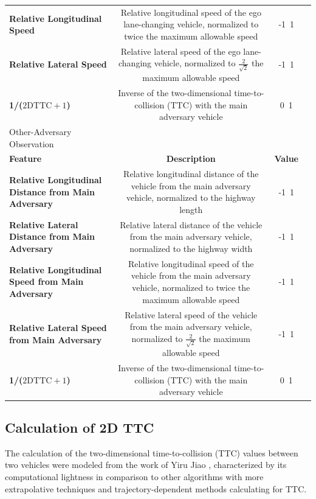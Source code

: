 \documentclass[12pt, a4paper]{report}
\begin{document}
\begin{table}[htbp]
\begin{tabular}{lccc}
        \textbf{Relative Longitudinal Speed} &  Relative longitudinal speed of the ego lane-changing vehicle, normalized to twice the maximum allowable speed & -1~1 \\
        \textbf{Relative Lateral Speed} &  Relative lateral speed of the ego lane-changing vehicle, normalized to $\frac{2}{\sqrt{2}}$ the maximum allowable speed & -1~1 \\
        \textbf{1/($\mathrm{2D TTC} + 1$)} &  Inverse of the two-dimensional time-to-collision (TTC) with the main adversary vehicle & 0~1 \\
        \midrule
        Other-Adversary Observation \\
        \midrule
        \textbf{Feature} & \textbf{Description} & \textbf{Value} \\
        \textbf{Relative Longitudinal Distance from Main Adversary} &  Relative longitudinal distance of the vehicle from the main adversary vehicle, normalized to the highway length & -1~1 \\
        \textbf{Relative Lateral Distance from Main Adversary} &  Relative lateral distance of the vehicle from the main adversary vehicle, normalized to the highway width & -1~1 \\
        \textbf{Relative Longitudinal Speed from Main Adversary} &  Relative longitudinal speed of the vehicle from the main adversary vehicle, normalized to twice the maximum allowable speed & -1~1 \\
        \textbf{Relative Lateral Speed from Main Adversary} &  Relative lateral speed of the vehicle from the main adversary vehicle, normalized to $\frac{2}{\sqrt{2}}$ the maximum allowable speed & -1~1 \\
        \textbf{1/($\mathrm{2D TTC} + 1$)} &  Inverse of the two-dimensional time-to-collision (TTC) with the main adversary vehicle & 0~1 \\
        \bottomrule
    \end{tabular}
\end{table}

\subsection{Calculation of 2D TTC}

The calculation of the two-dimensional time-to-collision (TTC) values between two vehicles were modeled from the work of Yiru Jiao \cite{jiao2023ttc}, characterized by its computational lightness in comparison to other algorithms with more extrapolative techniques and trajectory-dependent methods calculating for TTC.
\end{document}
